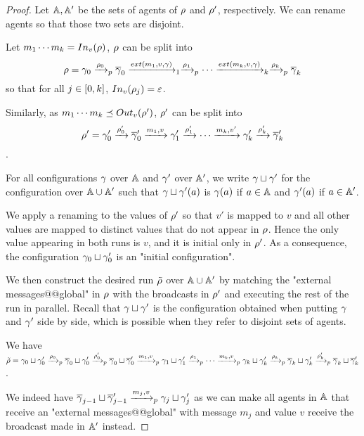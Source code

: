 \begin{proof}
	Let $\mathbb{A}, \mathbb{A}'$ be the sets of agents of $\rho$ and $\rho'$, respectively.
	We can rename agents so that those two sets are disjoint.
	
	Let $m_1 \cdots m_k = \vinput{v}{\run}$, $\rho$ can be split into \[ \run = \config_0 \pstep{\run_0} \overline{\config}_0 \extbr{m_1,v} \config_{1} \pstep{\run_1} \cdots \extbr{m_k,v} \config_{k} \pstep{\run_k} \overline{\config}_k\] 
	so that for all $j\in [0,k]$, $\vinput{v}{\run_j} = \varepsilon$.
	
	Similarly, as $m_1\cdots m_k \subword \voutput{v}{\run'}$, $\rho'$ can be split into \[\rho' = \gamma'_0 \xrightarrow{\rho'_0} \overline{\gamma}'_0 \xrightarrow{m_1, v} \gamma'_{1} \xrightarrow{\rho'_1} \cdots \xrightarrow{m_k,v'} \gamma'_{k} \xrightarrow{\rho'_k} \overline{\gamma}'_k \].
	
	For all configurations $\gamma$ over $\mathbb{A}$ and $\gamma'$ over $\mathbb{A}'$, we write $\gamma \sqcup \gamma'$ for the configuration over $\mathbb{A} \cup \mathbb{A}'$ such that $\gamma \sqcup \gamma'(a)$ is $\gamma(a)$ if $a \in \mathbb{A}$ and $\gamma'(a)$ if $a \in \mathbb{A}'$.
	
	We apply a renaming to the values of $\rho'$ so that $v'$ is mapped to $v$ and all other values are mapped to distinct values that do not appear in $\rho$.
	Hence the only value appearing in both runs is $v$, and it is initial only in $\rho'$. As a consequence, the configuration $\gamma_0 \sqcup \gamma'_0$ is an "initial configuration".
	
	We then construct the desired run $\Tilde{\rho}$ over $\mathbb{A} \cup \mathbb{A}'$ by matching the "external messages@@global" in $\rho$ with the broadcasts in $\rho'$ and executing the rest of the run in parallel. Recall that $\gamma \sqcup \gamma'$ is the configuration obtained when putting $\gamma$ and $\gamma'$ side by side, which is possible when they refer to disjoint sets of agents. 
	
	We have $\Tilde{\rho} = \gamma_0 \sqcup \gamma'_0 \xrightarrow{\rho_0}_{p} \overline{\gamma}_0 \sqcup \gamma'_0 \xrightarrow{\rho'_0}_{p} \overline{\gamma}_0 \sqcup \overline{\gamma}'_0 \xrightarrow{m_1, v}_{p} \gamma_{1} \sqcup \gamma'_1 \xrightarrow{\rho_1}_{p} \cdots \xrightarrow{m_k,v}_{p} \gamma_{k}  \sqcup \gamma'_{k} \xrightarrow{\rho_k}_{p}  \overline{\gamma}_k \sqcup \gamma'_k \xrightarrow{\rho'_k}_{p} \overline{\gamma}_k \sqcup \overline{\gamma}'_k$.
	
	We indeed have $\overline{\gamma}_{j-1} \sqcup \overline{\gamma}'_{j-1} \xrightarrow{m_j, v}_{p} \gamma_{j} \sqcup \gamma'_j$ as we can make all agents in $\mathbb{A}$ that receive an "external messages@@global" with message $m_j$ and value $v$ receive the broadcast made in $\mathbb{A}'$ instead.
	

\end{proof}
